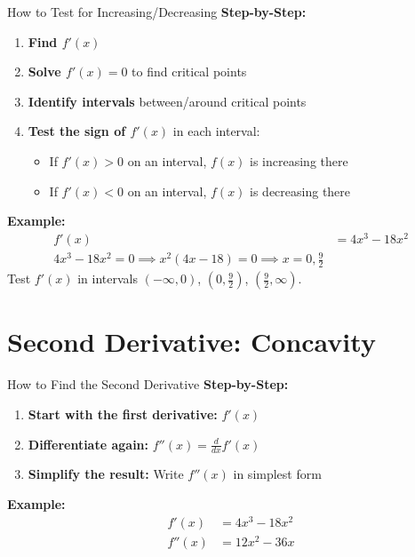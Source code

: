 \documentclass[aspectratio=169]{beamer}
\begin{document}
\begin{frame}{How to Test for Increasing/Decreasing}
\textbf{Step-by-Step:}
\begin{enumerate}
    \item \textbf{Find $f'(x)$}
    \item \textbf{Solve $f'(x) = 0$} to find critical points
    \item \textbf{Identify intervals} between/around critical points
    \item \textbf{Test the sign of $f'(x)$} in each interval:
    \begin{itemize}
        \item If $f'(x) > 0$ on an interval, $f(x)$ is increasing there
        \item If $f'(x) < 0$ on an interval, $f(x)$ is decreasing there
    \end{itemize}
\end{enumerate}
\textbf{Example:}
\[
\begin{aligned}
    f'(x) &= 4x^3 - 18x^2 \\
    4x^3 - 18x^2 = 0 \implies x^2(4x - 18) = 0 \implies x = 0, \frac{9}{2}
\end{aligned}
\]
Test $f'(x)$ in intervals $(-\infty, 0)$, $(0, \frac{9}{2})$, $(\frac{9}{2}, \infty)$.
\end{frame}

\section{Second Derivative: Concavity}

\begin{frame}{How to Find the Second Derivative}
\textbf{Step-by-Step:}
\begin{enumerate}
    \item \textbf{Start with the first derivative:} $f'(x)$
    \item \textbf{Differentiate again:} $f''(x) = \frac{d}{dx}f'(x)$
    \item \textbf{Simplify the result:} Write $f''(x)$ in simplest form
\end{enumerate}
\textbf{Example:}
\[
\begin{aligned}
    f'(x) &= 4x^3 - 18x^2 \\
    f''(x) &= 12x^2 - 36x
\end{aligned}
\]
\end{frame}
\end{document}
